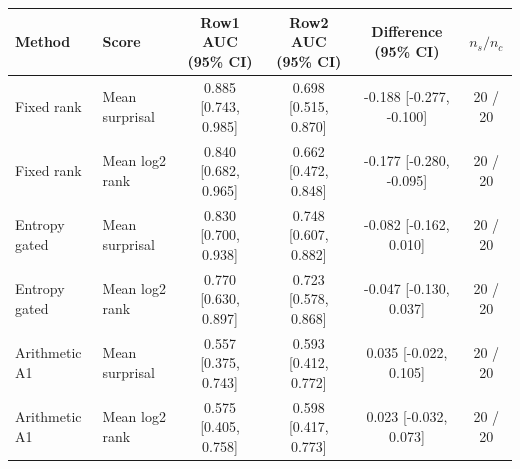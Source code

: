 \begin{tabular}{llcccc}
\hline
Method & Score & Row1 AUC (95\% CI) & Row2 AUC (95\% CI) & Difference (95\% CI) & $n_s/n_c$ \\
\hline
Fixed rank & Mean surprisal & 0.885 [0.743, 0.985] & 0.698 [0.515, 0.870] & -0.188 [-0.277, -0.100] & 20 / 20 \\
Fixed rank & Mean log2 rank & 0.840 [0.682, 0.965] & 0.662 [0.472, 0.848] & -0.177 [-0.280, -0.095] & 20 / 20 \\
Entropy gated & Mean surprisal & 0.830 [0.700, 0.938] & 0.748 [0.607, 0.882] & -0.082 [-0.162, 0.010] & 20 / 20 \\
Entropy gated & Mean log2 rank & 0.770 [0.630, 0.897] & 0.723 [0.578, 0.868] & -0.047 [-0.130, 0.037] & 20 / 20 \\
Arithmetic A1 & Mean surprisal & 0.557 [0.375, 0.743] & 0.593 [0.412, 0.772] & 0.035 [-0.022, 0.105] & 20 / 20 \\
Arithmetic A1 & Mean log2 rank & 0.575 [0.405, 0.758] & 0.598 [0.417, 0.773] & 0.023 [-0.032, 0.073] & 20 / 20 \\
\hline
\end{tabular}
